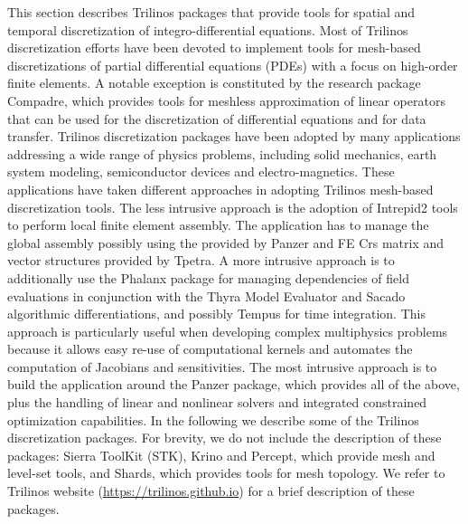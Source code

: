 
This section describes Trilinos packages that provide tools for spatial and temporal discretization of integro-differential equations. Most of Trilinos discretization efforts have been devoted to implement tools for mesh-based discretizations of partial differential equations (PDEs) with a focus on high-order finite elements. A notable exception is constituted by the research package Compadre, which provides tools for meshless approximation of linear operators that can be used for the discretization of differential equations and for data transfer.
Trilinos discretization packages have been adopted by many applications addressing a wide range of physics problems, including solid mechanics, earth system modeling, semiconductor devices and electro-magnetics. These applications have taken different approaches in adopting Trilinos mesh-based discretization tools. The less intrusive approach is the adoption of Intrepid2 tools to perform local finite element assembly. The application has to manage the global assembly possibly using the  provided by Panzer and FE Crs matrix and vector structures provided by Tpetra.
A more intrusive approach is to additionally use the Phalanx package for managing dependencies of field evaluations in conjunction with the Thyra Model Evaluator and Sacado algorithmic differentiations, and possibly Tempus for time integration. This approach is particularly useful when developing complex multiphysics problems because it allows easy re-use of computational kernels and automates the computation of Jacobians and sensitivities.
The most intrusive approach is to build the application around the Panzer package, which provides all of the above, plus the handling of linear and nonlinear solvers and integrated constrained optimization capabilities.
In the following we describe some of the Trilinos discretization packages. For brevity, we do not include the description of these packages: Sierra ToolKit (STK), Krino and Percept, which provide mesh and level-set tools, and Shards, which provides tools for mesh topology. We refer to Trilinos website (\url{https://trilinos.github.io}) for a brief description of these packages.


